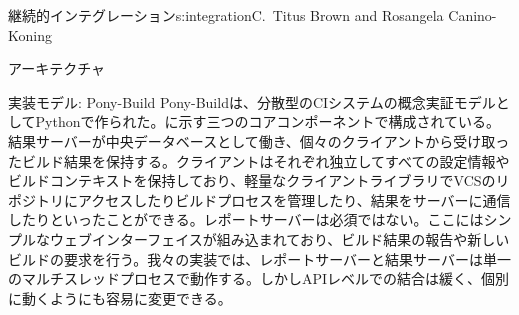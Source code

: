 \begin{aosachapter}{継続的インテグレーション}{s:integration}{C.\ Titus Brown and Rosangela Canino-Koning}
\begin{aosasect1}{アーキテクチャ}
\begin{aosasect2}{実装モデル: Pony-Build}
Pony-Buildは、分散型のCIシステムの概念実証モデルとしてPythonで作られた。に示す三つのコアコンポーネントで構成されている。結果サーバーが中央データベースとして働き、個々のクライアントから受け取ったビルド結果を保持する。クライアントはそれぞれ独立してすべての設定情報やビルドコンテキストを保持しており、軽量なクライアントライブラリでVCSのリポジトリにアクセスしたりビルドプロセスを管理したり、結果をサーバーに通信したりといったことができる。レポートサーバーは必須ではない。ここにはシンプルなウェブインターフェイスが組み込まれており、ビルド結果の報告や新しいビルドの要求を行う。我々の実装では、レポートサーバーと結果サーバーは単一のマルチスレッドプロセスで動作する。しかしAPIレベルでの結合は緩く、個別に動くようにも容易に変更できる。


\end{aosasect2}
\end{aosasect1}
\end{aosachapter}

